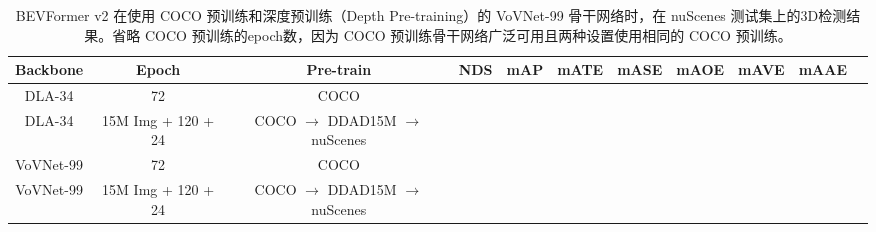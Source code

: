\setlength{\tabcolsep}{3pt}
\setlength{\doublerulesep}{2\arrayrulewidth}
\renewcommand{\arraystretch}{1.0}
\begin{table}[t]
    \caption{BEVFormer v2 在使用 COCO 预训练和深度预训练（Depth Pre-training）的 VoVNet-99 骨干网络时，在 nuScenes 测试集上的3D检测结果。省略 COCO 预训练的epoch数，因为 COCO 预训练骨干网络广泛可用且两种设置使用相同的 COCO 预训练。}
    \label{table:depth_pretrain}
    \centering

    \begin{tabular}{c|c|c|cc|cccccc}
        \toprule
        Backbone & Epoch & Pre-train & NDS & mAP & mATE & mASE & mAOE & mAVE & mAAE   \\ 
        \midrule
        DLA-34 & 72 & COCO & & & & & & & & \\ 
        DLA-34 & \small{15M Img + 120 + 24} & \small{COCO $\xrightarrow{}$ DDAD15M $\xrightarrow{}$ nuScenes} & & & & & & & \\ 
        \midrule
        VoVNet-99 & 72 & COCO & & & & & & & & \\ 
        VoVNet-99 & \small{15M Img + 120 + 24} & \small{COCO $\xrightarrow{}$ DDAD15M $\xrightarrow{}$ nuScenes} & & & & & & & \\ 
        \bottomrule
    \end{tabular}
\end{table}